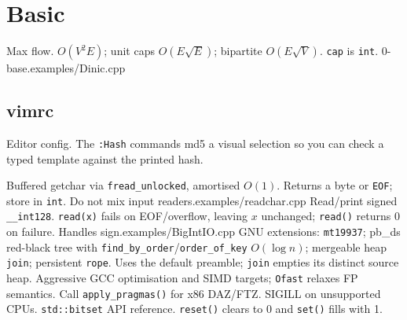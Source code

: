 \section{Basic}
%
%
%
{Max flow. $O(V^2E)$; unit caps $O(E\sqrt{E})$; bipartite $O(E\sqrt{V})$. \texttt{cap} is \texttt{int}. 0-base.}{examples/Dinic.cpp}
\subsection{vimrc}
{\footnotesize Editor config. The \texttt{:Hash} commands md5 a visual selection so you can check a typed template against the printed hash.\par}\vspace{-0.6em}%

%
{Buffered getchar via \texttt{fread\_unlocked}, amortised $O(1)$. Returns a byte or \texttt{EOF}; store in \texttt{int}. Do not mix input readers.}{examples/readchar.cpp}
%
{Read/print signed \texttt{\_\_int128}. \texttt{read(x)} fails on EOF/overflow, leaving $x$ unchanged; \texttt{read()} returns 0 on failure. Handles sign.}{examples/BigIntIO.cpp}
%
{GNU extensions: \texttt{mt19937}; pb\_ds red-black tree with \texttt{find\_by\_order}/\texttt{order\_of\_key} $O(\log n)$; mergeable heap \texttt{join}; persistent \texttt{rope}. Uses the default preamble; \texttt{join} empties its distinct source heap.}
%
{Aggressive GCC optimisation and SIMD targets; \texttt{Ofast} relaxes FP semantics. Call \texttt{apply\_pragmas()} for x86 DAZ/FTZ. SIGILL on unsupported CPUs.}
%
{\texttt{std::bitset} API reference. \texttt{reset()} clears to 0 and \texttt{set()} fills with 1.}
% 


